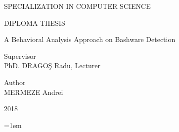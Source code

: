 \documentclass[12pt]{extreport}
\begin{document}
\begin{titlepage}
        \begin{center}
        {\Large SPECIALIZATION IN COMPUTER SCIENCE}
        \end{center}

        \vfill

        \begin{center}
        {\LARGE DIPLOMA THESIS}
        \end{center}

        \begin{center}
        {\Huge A Behavioral Analysis Approach on Bashware Detection}
        \end{center}

        \vfill

        \begin{flushleft}
        {\LARGE Supervisor \\ PhD. DRAGOŞ Radu, Lecturer}
        \end{flushleft}

        \begin{flushright}
        {\Large Author \\ MERMEZE Andrei}
        \end{flushright}

        \vfill

        \begin{center}
        {\LARGE 2018}
    \end{center}

    \end{titlepage}
    \restoregeometry
    \pagestyle{plain}

    

    \tableofcontents
    \pagebreak

    

    
    
    
    
    
    
    
    
    

    \titleformat{\chapter}{}{}{0em}{\bfseries\LARGE}
    \nocite{*}
    \emergencystretch=1em
    \printbibliography[heading=bibintoc, title={References}]
\end{document}
